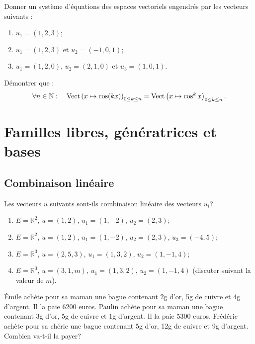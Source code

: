 \documentclass{book}
\begin{document}
 \begin{Exercice}
Donner un système d'équations des espaces vectoriels engendrés par les vecteurs suivants :
\begin{enumerate}
\item $u_1=(1,2,3)$;
\item $u_1=(1,2,3)$ et $u_2=(-1,0,1)$;
\item $u_1=(1,2,0)$, $u_2=(2,1,0)$ et $u_3=(1,0,1)$.
\end{enumerate}
\end{Exercice}
 \begin{Exercice}[**, trigonométrie]
Démontrer que :
$$\forall n\in\mathbb{N} : \quad \operatorname{Vect} \left( x\mapsto \cos(kx) \right)_{0\leq k\leq n}= \operatorname{Vect} \left( x\mapsto \cos^k x \right)_{0\leq k\leq n}.$$ 
\end{Exercice}

\section{Familles libres, génératrices et bases}



\subsection{Combinaison linéaire}
 \begin{Exercice}
Les vecteurs $u$ suivants sont-ils combinaison linéaire des vecteurs $u_i$?
\begin{enumerate}
\item $E=\mathbb R^2$, $u=(1,2)$, $u_1=(1,-2)$, $u_2=(2,3)$;
\item $E=\mathbb R^2$, $u=(1,2)$, $u_1=(1,-2)$, $u_2=(2,3)$, $u_3=(-4,5)$;
\item $E=\mathbb R^3$, $u=(2,5,3)$, $u_1=(1,3,2)$, $u_2=(1,-1,4)$;
\item $E=\mathbb R^3$, $u=(3,1,m)$, $u_1=(1,3,2)$, $u_2=(1,-1,4)$ (discuter suivant la valeur de $m$).
\end{enumerate}
\end{Exercice}
 \begin{Exercice}
\'Emile achète pour sa maman une bague contenant 2g d'or, 5g de cuivre et 4g d'argent. Il la paie 6200 euros.\newline
Paulin achète pour sa maman une bague contenant 3g d'or, 5g de cuivre et 1g d'argent. Il la paie 5300 euros.\newline
Frédéric achète pour sa chérie une bague contenant 5g d'or, 12g de cuivre et 9g d'argent. Combien va-t-il la payer?
\end{Exercice}
\end{document}
